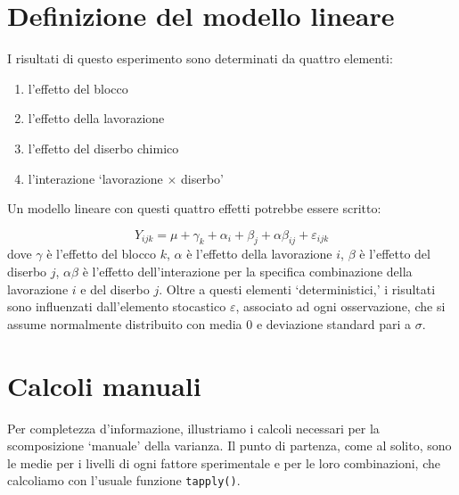 \documentclass[a4paper,12pt,oneside]{book}
\providecommand{\tightlist}{%
  \setlength{\itemsep}{0pt}\setlength{\parskip}{0pt}}
\begin{document}
\hypertarget{definizione-del-modello-lineare-1}{%
\section{Definizione del modello lineare}\label{definizione-del-modello-lineare-1}}

I risultati di questo esperimento sono determinati da quattro elementi:

\begin{enumerate}
\def\labelenumi{\arabic{enumi}.}
\tightlist
\item
  l'effetto del blocco
\item
  l'effetto della lavorazione
\item
  l'effetto del diserbo chimico
\item
  l'interazione `lavorazione \(\times\) diserbo'
\end{enumerate}

Un modello lineare con questi quattro effetti potrebbe essere scritto:

\[Y_{ijk} = \mu + \gamma_k + \alpha_i + \beta_j + \alpha\beta_{ij} + \varepsilon_{ijk}\]
dove \(\gamma\) è l'effetto del blocco \(k\), \(\alpha\) è l'effetto della lavorazione \(i\), \(\beta\) è l'effetto del diserbo \(j\), \(\alpha\beta\) è l'effetto dell'interazione per la specifica combinazione della lavorazione \(i\) e del diserbo \(j\). Oltre a questi elementi `deterministici,' i risultati sono influenzati dall'elemento stocastico \(\varepsilon\), associato ad ogni osservazione, che si assume normalmente distribuito con media 0 e deviazione standard pari a \(\sigma\).

\hypertarget{calcoli-manuali}{%
\section{Calcoli manuali}\label{calcoli-manuali}}

Per completezza d'informazione, illustriamo i calcoli necessari per la scomposizione `manuale' della varianza. Il punto di partenza, come al solito, sono le medie per i livelli di ogni fattore sperimentale e per le loro combinazioni, che calcoliamo con l'usuale funzione \texttt{tapply()}.
\end{document}
